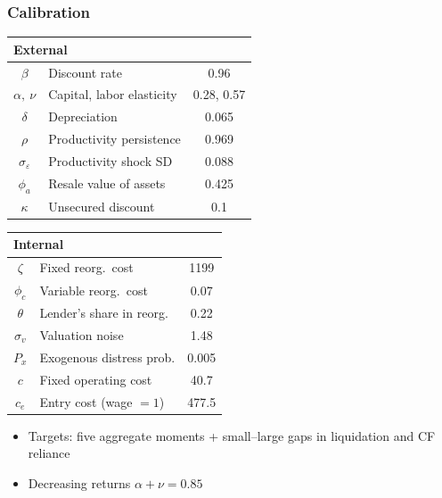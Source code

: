 \documentclass[aspectratio=169,xcolor=table]{beamer}
\begin{document}
\begin{frame}[label=Calibration] \frametitle{Calibration \hfill \hyperlink{ModelFit}{}}

\footnotesize
\begin{table}[h!]
\centering
\renewcommand{\arraystretch}{0.85}
\begin{minipage}{0.48\textwidth}
\centering
\begin{tabular}{c|l|c}
\multicolumn{3}{l}{\textbf{External}} \\
\toprule
$\beta$ & Discount rate & 0.96 \\
$\alpha,\ \nu$ & Capital, labor elasticity & 0.28, 0.57 \\
$\delta$ & Depreciation & 0.065 \\
$\rho$ & Productivity persistence & 0.969 \\
$\sigma_\varepsilon$ & Productivity shock SD & 0.088 \\
$\phi_a$ & Resale value of assets & 0.425 \\
$\kappa$ & Unsecured discount & 0.1 \\
\bottomrule
\end{tabular}
\end{minipage}
\hfill
\begin{minipage}{0.48\textwidth}
\centering
\begin{tabular}{c|l|c}
\multicolumn{3}{l}{\textbf{Internal}} \\
\toprule
$\zeta$ & Fixed reorg.\ cost & 1199 \\
$\phi_c$ & Variable reorg.\ cost & 0.07 \\
$\theta$ & Lender's share in reorg. & 0.22 \\
$\sigma_v$ & Valuation noise & 1.48 \\
$P_x$ & Exogenous distress prob. & 0.005 \\
$c$ & Fixed operating cost & 40.7 \\
$c_e$ & Entry cost (wage $=1$) & 477.5 \\
\bottomrule
\end{tabular}
\end{minipage}
\end{table}
\normalsize

\begin{itemize} \small
    \item Targets: five aggregate moments + small--large gaps in liquidation and CF reliance
    \item Decreasing returns $\alpha + \nu = 0.85$
\end{itemize}

\end{frame}
\end{document}
